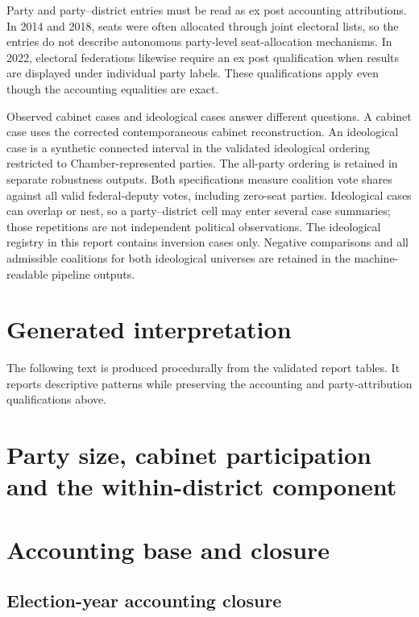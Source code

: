 \documentclass[11pt]{article}
\newcommand{\ReportLatexRoot}{../../output/decomposition/latex/report}
\begin{document}
Party and party--district entries must be read as ex post accounting
attributions. In 2014 and 2018, seats were often allocated through joint
electoral lists, so the entries do not describe autonomous party-level
seat-allocation mechanisms. In 2022, electoral federations likewise require an
ex post qualification when results are displayed under individual party
labels. These qualifications apply even though the accounting equalities are
exact.

Observed cabinet cases and ideological cases answer different questions. A
cabinet case uses the corrected contemporaneous cabinet reconstruction. An
ideological case is a synthetic connected interval in the validated ideological
ordering restricted to Chamber-represented parties. The all-party ordering is
retained in separate robustness outputs. Both specifications measure coalition
vote shares against all valid federal-deputy votes, including zero-seat parties. Ideological cases can
overlap or nest, so a party--district cell may enter several case summaries;
those repetitions are not independent political observations. The ideological
registry in this report contains inversion cases only. Negative comparisons and all admissible coalitions for both ideological
universes are retained in the machine-readable pipeline outputs.

\section{Generated interpretation}

The following text is produced procedurally from the validated report tables.
It reports descriptive patterns while preserving the accounting and
party-attribution qualifications above.



\section{Party size, cabinet participation and the within-district component}



\section{Accounting base and closure}

\subsection{Election-year accounting closure}
\end{document}
